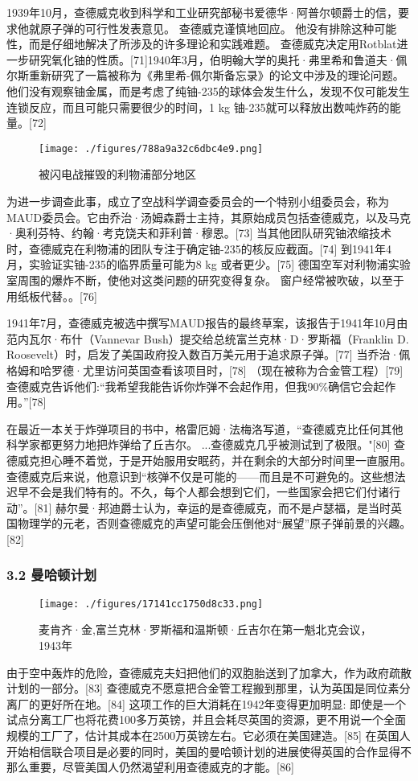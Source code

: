 1939年10月，查德威克收到科学和工业研究部秘书爱德华·阿普尔顿爵士的信，要求他就原子弹的可行性发表意见。 查德威克谨慎地回应。 他没有排除这种可能性，而是仔细地解决了所涉及的许多理论和实践难题。 查德威克决定用Rotblat进一步研究氧化铀的性质。[71]1940年3月，伯明翰大学的奥托·弗里希和鲁道夫·佩尔斯重新研究了一篇被称为《弗里希-佩尔斯备忘录》的论文中涉及的理论问题。他们没有观察铀金属，而是考虑了纯铀-235的球体会发生什么，发现不仅可能发生连锁反应，而且可能只需要很少的时间，1 kg 铀-235就可以释放出数吨炸药的能量。[72]
\begin{figure}[ht]
\centering
\texttt{[image: ./figures/788a9a32c6dbc4e9.png]}
\caption{被闪电战摧毁的利物浦部分地区} \label{fig_CHFR_6}
\end{figure}
为进一步调查此事，成立了空战科学调查委员会的一个特别小组委员会，称为 MAUD委员会。它由乔治·汤姆森爵士主持，其原始成员包括查德威克，以及马克·奥利芬特、约翰·考克饶夫和菲利普·穆恩。[73] 当其他团队研究铀浓缩技术时，查德威克在利物浦的团队专注于确定铀-235的核反应截面。[74] 到1941年4月，实验证实铀-235的临界质量可能为8 kg 或者更少。[75] 德国空军对利物浦实验室周围的爆炸不断，使他对这类问题的研究变得复杂。 窗户经常被吹破，以至于用纸板代替。。[76]

1941年7月，查德威克被选中撰写MAUD报告的最终草案，该报告于1941年10月由范内瓦尔·布什（Vannevar Bush）提交给总统富兰克林·D·罗斯福（Franklin D. Roosevelt）时，启发了美国政府投入数百万美元用于追求原子弹。[77] 当乔治·佩格姆和哈罗德·尤里访问英国查看该项目时，[78] （现在被称为合金管工程）[79] 查德威克告诉他们:“我希望我能告诉你炸弹不会起作用，但我90\%确信它会起作用。”[78]

在最近一本关于炸弹项目的书中，格雷厄姆·法梅洛写道，“查德威克比任何其他科学家都更努力地把炸弹给了丘吉尔。 ...查德威克几乎被测试到了极限。"[80] 查德威克担心睡不着觉，于是开始服用安眠药，并在剩余的大部分时间里一直服用。查德威克后来说，他意识到“核弹不仅是可能的——而且是不可避免的。这些想法迟早不会是我们特有的。不久，每个人都会想到它们，一些国家会把它们付诸行动”。[81] 赫尔曼·邦迪爵士认为，幸运的是查德威克，而不是卢瑟福，是当时英国物理学的元老，否则查德威克的声望可能会压倒他对“展望”原子弹前景的兴趣。[82]

\subsubsection{3.2 曼哈顿计划}
\begin{figure}[ht]
\centering
\texttt{[image: ./figures/17141cc1750d8c33.png]}
\caption{麦肯齐·金,富兰克林·罗斯福和温斯顿·丘吉尔在第一魁北克会议，1943年} \label{fig_CHFR_7}
\end{figure}
由于空中轰炸的危险，查德威克夫妇把他们的双胞胎送到了加拿大，作为政府疏散计划的一部分。[83] 查德威克不愿意把合金管工程搬到那里，认为英国是同位素分离厂的更好所在地。[84] 这项工作的巨大消耗在1942年变得更加明显: 即使是一个试点分离工厂也将花费100多万英镑，并且会耗尽英国的资源，更不用说一个全面规模的工厂了，估计其成本在2500万英镑左右。它必须在美国建造。[85] 在英国人开始相信联合项目是必要的同时，美国的曼哈顿计划的进展使得英国的合作显得不那么重要，尽管美国人仍然渴望利用查德威克的才能。[86]

